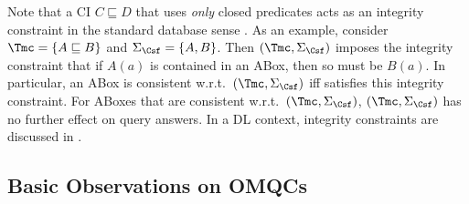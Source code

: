 \documentclass{lmcs}
\theoremstyle{definition}
\begin{document}
Note that a CI $C \sqsubseteq D$ that uses \emph{only} closed
predicates acts as an integrity constraint in the standard database
sense \cite{abiteboul95foundations}. As an example, consider $\Tmc =
\{ A \sqsubseteq B\}$ and $\Sigma_\Csf = \{ A,B \}$. Then
$(\Tmc,\Sigma_\Csf)$ imposes the integrity constraint that if $A(a)$
is contained in an ABox, then so must be $B(a)$. In particular, an
ABox \Amc is consistent w.r.t.\ $(\Tmc,\Sigma_\Csf)$ iff \Amc
satisfies this integrity constraint. For ABoxes \Amc that are
consistent w.r.t.\ $(\Tmc,\Sigma_\Csf)$, $(\Tmc,\Sigma_\Csf)$ has no
further effect on query answers. In a DL context, integrity
constraints are discussed in
\cite{calvanese07eql,DBLP:journals/tocl/DoniniNR02,DBLP:conf/esws/MehdiRG11,DBLP:journals/ws/MotikHS09,DBLP:journals/jacm/MotikR10}.



\subsection{Basic Observations on OMQCs}
\end{document}
